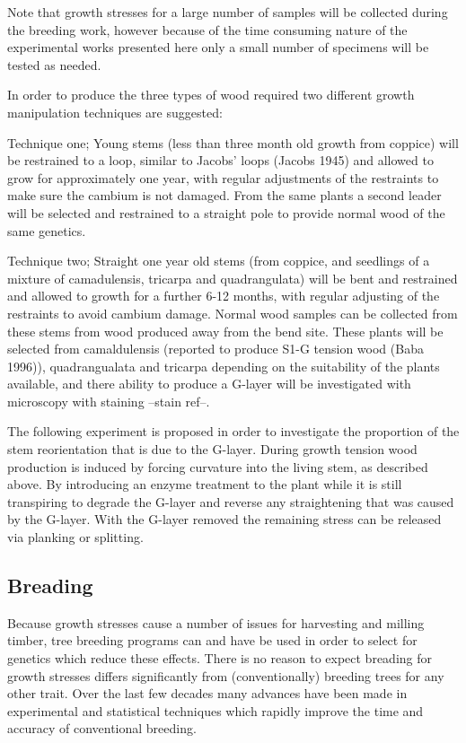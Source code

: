 \documentclass{article}
\begin{document}
Note that growth stresses for a large number of samples will be collected during
the breeding work, however because of the time consuming nature of the
experimental works presented here only a small number of specimens will be
tested as needed.

In order to produce the three types of wood required two different growth
manipulation techniques are suggested:

Technique one; Young stems (less than three month old growth from coppice) will
be restrained to a loop, similar to Jacobs' loops (Jacobs 1945) and allowed to
grow for approximately one year, with regular adjustments of the restraints to
make sure the cambium is not damaged. From the same plants a second leader will
be selected and restrained to a straight pole to provide normal wood of the same
genetics.

Technique two; Straight one year old stems (from coppice, and seedlings of a
mixture of camadulensis, tricarpa and quadrangulata) will be bent and restrained
and allowed to growth for a further 6-12 months, with regular adjusting of the
restraints to avoid cambium damage. Normal wood samples can be collected from
these stems from wood produced away from the bend site. These plants will be
selected from camaldulensis (reported to produce S1-G tension wood (Baba 1996)),
quadrangualata and tricarpa depending on the suitability of the plants
available, and there ability to produce a G-layer will be investigated with
microscopy with staining --stain ref--.

The following experiment is proposed in order to investigate the proportion of
the stem reorientation that is due to the G-layer. During growth tension wood
production is induced by forcing curvature into the living stem, as described
above. By introducing an enzyme treatment to the plant while it is still
transpiring to degrade the G-layer and reverse any straightening that was caused
by the G-layer. With the G-layer removed the remaining stress can be released
via planking or splitting.

\subsection{Breading}
Because growth stresses cause a number of issues for harvesting and milling
timber, tree breeding programs can and have be used in order to select for
genetics which reduce these effects. There is no reason to expect  breading for
growth stresses differs significantly from (conventionally) breeding trees for
any other trait. Over the last few decades many advances have been made in
experimental and statistical techniques which rapidly improve the time and
accuracy of conventional breeding.
\end{document}
